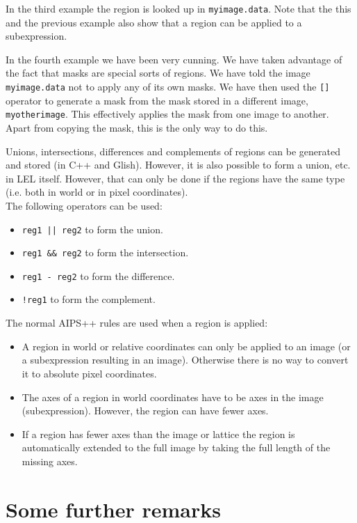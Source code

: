 \medskip\noindent In the third example the region is looked up in \texttt{myimage.data}.
Note that the this and the previous example also show that a region can be applied
to a subexpression.

\medskip\noindent In the fourth example we have been very cunning.  We have taken
advantage of the fact that masks are special sorts of regions.  We have
told the image {\tt myimage.data} not to apply any of its own masks.  We
have then used the {\tt []} operator to generate a mask from the mask
stored in a different image, {\tt myotherimage}.  This effectively
applies the mask from one image to another.  Apart from copying the
mask, this is the only way to do this. 

\medskip\noindent Unions, intersections, differences and complements of regions can be
generated and stored (in C++ and Glish).  However, it is also possible
to form a union, etc.  in LEL itself.  However, that can only be done if
the regions have the same type (i.e.  both in world or in pixel
coordinates). 
\\The following operators can be used:

\begin{itemize}
\item {\tt reg1 || reg2} to form the union.
\item {\tt reg1 \&\& reg2} to form the intersection.
\item {\tt reg1 - reg2} to form the difference.
\item {\tt !reg1} to form the complement.
\end{itemize}

The normal AIPS++ rules are used when a region is applied:

\begin{itemize}
\item A region in world or relative coordinates can only be applied
to an image (or a subexpression resulting in an image). Otherwise
there is no way to convert it to absolute pixel coordinates.
\item The axes of a region in world coordinates have to be axes in
the image (subexpression). However, the region can have fewer axes.
\item If a region has fewer axes than the image or lattice
the region is automatically extended to the full image
by taking the full length of the missing axes.
\end{itemize}


\section{Some further remarks}

